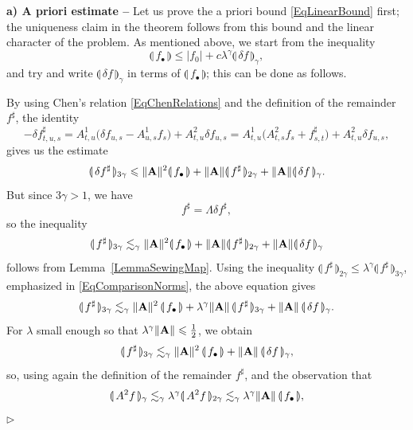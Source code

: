 \documentclass[11pt,a4paper]{amsart}
\renewcommand{\leq}{\leqslant}
\numberwithin{equation}{section} %
\newenvironment{Dem}{%
    \begin{list}{\hspace{0.5cm}{\sc Proof --}}{%
        \setlength{\topsep}{0pt}%
        \setlength{\leftmargin}{0pt}%
        \setlength{\rightmargin}{0pt}%
        \setlength{\listparindent}{0pt}%
        \setlength{\itemindent}{0pt}%
        \setlength{\parsep}{0pt}%
        \addtolength{\leftmargin}{20pt}%
        \addtolength{\rightmargin}{0pt}%
    } \item }{\hfill{\space $\rhd$}\end{list}\smallskip}
\begin{document}
\begin{Dem}
{\bf a) A priori estimate --} Let us prove the a priori bound \eqref{EqLinearBound} first; the uniqueness claim in the theorem follows from this bound and the linear character of the problem. As mentioned above, we start from the inequality
$$
\llparenthesis\,f_\bullet \,\rrparenthesis \leq | f_0 | + c \lambda^\gamma \llparenthesis\, \delta f \,\rrparenthesis _\gamma,
$$
and try and write $\llparenthesis\, \delta f \,\rrparenthesis _\gamma$ in terms of $\llparenthesis\,f_\bullet \,\rrparenthesis$; this can be done as follows.

By using Chen's relation \eqref{EqChenRelations} and the definition of the remainder $f^\sharp$, the identity
$$
- \delta f^\sharp_{t, u, s} = A^1_{t, u} \Big(\delta f_{u, s}  -A^1_{u, s} f_s\Big) +A^2_{t, u} \delta f_{u, s} = A^1_{t, u} \Big(A^2_{t, s} f_s + f^{\sharp}_{s, t}\Big) + A^2_{t, u} \delta f_{u, s}, 
$$
gives us the estimate
$$
\llparenthesis\, \delta f^{\sharp} \,\rrparenthesis_{3 \gamma} \leq \| {\bf A} \| ^2 \llparenthesis\, f_\bullet \,\rrparenthesis + \| {\bf A} \| \llparenthesis\, f^{\sharp} \,\rrparenthesis_{2 \gamma} + \| {\bf A} \| \llparenthesis\, \delta f \,\rrparenthesis_\gamma.
$$ 
But since $3 \gamma > 1$, we have 
$$
f^{\sharp} = \Lambda \delta f^{\sharp},
$$ 
so the inequality
$$
\llparenthesis\, f^{\sharp} \,\rrparenthesis_{3 \gamma} \lesssim_\gamma \| {\bf A} \|^2 \llparenthesis\, f_\bullet \,\rrparenthesis + \| {\bf A} \| \llparenthesis\, f^{\sharp} \,\rrparenthesis_{2 \gamma} + \| {\bf A} \| \llparenthesis\, \delta f \,\rrparenthesis_\gamma
$$
follows from Lemma~\ref{LemmaSewingMap}. Using the inequality $\llparenthesis\,  f^{\sharp} \,\rrparenthesis_{2 \gamma} \leq \lambda^\gamma \llparenthesis\,  f^{\sharp} \,\rrparenthesis_{3 \gamma}$, emphasized in \eqref{EqComparisonNorms}, the above equation gives 
$$
\llparenthesis\,  f^{\sharp} \,\rrparenthesis_{3 \gamma} \lesssim_\gamma \| {\bf A} \|^2\, \llparenthesis\,  f_\bullet \,\rrparenthesis  + \lambda^\gamma \| {\bf A} \|\,\llparenthesis\,  f^{\sharp}\,\rrparenthesis_{3 \gamma} + \| {\bf A} \|\, \llparenthesis\, \delta f \,\rrparenthesis_\gamma.
$$
For $\lambda$ small enough so that $\lambda^\gamma \| {\bf A} \| \leq \frac{1}{2}$, we obtain
$$
\llparenthesis\,  f^{\sharp} \,\rrparenthesis_{3 \gamma} \lesssim_{\gamma} \| {\bf A} \|^2\, \llparenthesis\,  f_\bullet \,\rrparenthesis  + \| {\bf A} \|\, \llparenthesis\, \delta f \,\rrparenthesis_\gamma,
$$
so, using again the definition of the remainder $f^\sharp$, and the observation that 
$$
\llparenthesis\, A^2 f\,\rrparenthesis_{\gamma} \lesssim_{\gamma}  \lambda^\gamma \llparenthesis\, A^2 f\,\rrparenthesis_{2 \gamma} \lesssim_{\gamma} \lambda^\gamma \| {\bf A} \|\, \llparenthesis\, f_\bullet \,\rrparenthesis,
$$
\end{Dem}
\end{document}
